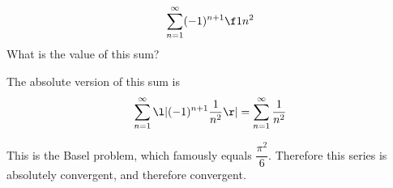\documentclass[a4paper]{article}
\begin{document}
\subsection{~} %

\begin{questionbody}
\[ \sum_{n=1}^\infty (-1)^{n+1} \f1{n^2} \]
What is the value of this sum?
\end{questionbody}

The absolute version of this sum is $$\sum_{n=1}^\infty \l| (-1)^{n+1} \frac1{n^2} \r| = \sum_{n=1}^\infty \frac1{n^2}$$

This is the Basel problem, which famously equals $\dfrac{\pi^2}6$. Therefore this series is absolutely convergent, and therefore convergent.
\end{document}
